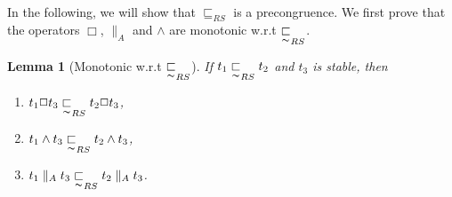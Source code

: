 \documentclass{elsarticle}
\theoremstyle{plain}
\newtheorem{lemma}[theorem]{Lemma}
\theoremstyle{definition}
\begin{document}
In the following, we will show that $\sqsubseteq_{RS}$ is a precongruence.
We first prove that the operators $\Box$, $\parallel_A$ and $\wedge$ are monotonic w.r.t $\underset{\thicksim}{\sqsubset}_{RS}$.

\begin{lemma}[Monotonic w.r.t $\underset{\thicksim}{\sqsubset}_{RS}$]\label{L:CONGRUENCE_STABLE}
If $t_1 \underset{\thicksim}{\sqsubset}_{RS} t_2$ and $t_3$ is stable, then
\begin{enumerate}
  \item $t_1 \Box t_3 \underset{\thicksim}{\sqsubset}_{RS} t_2 \Box t_3$,
  \item $t_1 \wedge t_3 \underset{\thicksim}{\sqsubset}_{RS} t_2\wedge t_3$,
  \item $t_1\parallel_A t_3 \underset{\thicksim}{\sqsubset}_{RS} t_2\parallel_A t_3$.
\end{enumerate}
\end{lemma}
\end{document}
